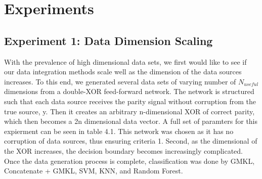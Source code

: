 \documentclass{article}
\begin{document}
\section*{Experiments}

\subsection*{Experiment 1: Data Dimension Scaling}
With the prevalence of high dimensional data sets, we first would like to see
if our data integration methods scale well as the dimension of the data sources
increases. To this end, we generated several data sets of varying number of
$N_{useful}$ dimensions from a double-XOR feed-forward network. The network is
structured such that each data source receives the parity signal without
corruption from the true source, y. Then it creates an arbitrary n-dimensional
XOR of correct parity, which then becomes a 2n dimensional data vector.  A full
set of paramters for this expierment can be seen in table 4.1. This network was
chosen as it has no corruption of data sources, thus ensuring criteria 1.
Second, as the dimensional of the XOR increases, the decision boundary becomes
increasingly complicated. Once the data generation process is complete,
classification was done by GMKL, Concatenate + GMKL, SVM, KNN, and Random
Forest.
\end{document}

